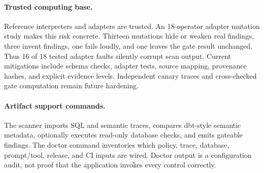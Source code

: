 \paragraph{Trusted computing base.}
Reference interpreters and adapters are trusted. An 18-operator adapter mutation study makes this risk concrete. Thirteen mutations hide or weaken real findings, three invent findings, one fails loudly, and one leaves the gate result unchanged. Thus 16 of 18 tested adapter faults silently corrupt scan output. Current mitigations include schema checks, adapter tests, source mapping, provenance hashes, and explicit evidence levels. Independent canary traces and cross-checked gate computation remain future hardening.

\paragraph{Artifact support commands.}
The scanner imports SQL and semantic traces, compares dbt-style semantic metadata, optionally executes read-only database checks, and emits gateable findings. The doctor command inventories which policy, trace, database, prompt/tool, release, and CI inputs are wired. Doctor output is a configuration audit, not proof that the application invokes every control correctly.
